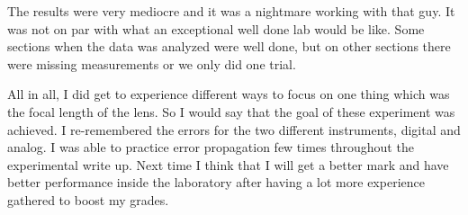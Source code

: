 \documentclass{article}
\begin{document}
The results were very mediocre and it was a nightmare working with that guy.
It was not on par with what an exceptional well done lab would be like.
Some sections when the data was analyzed were well done, but on other sections
there were missing measurements or we only did one trial.

All in all, I did get to experience different ways to focus on one thing 
which was the focal length of the lens. So I would say that the goal of
these experiment was achieved. I re-remembered the errors for the two 
different instruments, digital and analog.
I was able to practice error propagation few times throughout the experimental write up. 
Next time I think that I will get a better mark and have better performance
inside the laboratory after having a lot more experience gathered to boost my grades.




\end{document}

